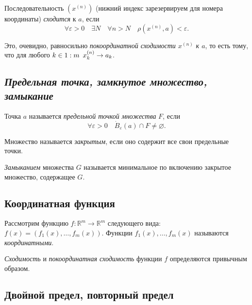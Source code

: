 \begin{definition}
	Последовательность  \((x^{(n)})\) (нижний индекс зарезервируем для номера координаты) \textit{сходится} к \(a\), если \[
		\forall \varepsilon > 0 \quad \exists N \quad \forall n > N \quad \rho(x^{(n)}, a) < \varepsilon.
	\]
	
	Это, очевидно, равносильно \textit{покоординатной сходимости \(x^{(n)}\) к \(a\)}, то есть тому, что для любого \(k \in 1 : m \enskip x_k^{(n)} \to a_k\).
\end{definition}

\subsection{\itshape Предельная точка, замкнутое множество, замыкание}

\begin{definition}
	Точка  \(a\) называется \textit{предельной точкой множества} \(F\), если \[
		\forall \varepsilon > 0 \quad \dot B_\varepsilon (a) \cap F \neq \varnothing.
	\]
	
	Множество называется \textit{закрытым}, если оно содержит все свои предельные точки.
	
	\textit{Замыканием} множества \(G\) называется минимальное по включению закрытое множество, содержащее \(G\).
\end{definition}

\subsection{Координатная функция}

\begin{definition}
	Рассмотрим функцию \(f \colon \mathbb{R}^m \to \mathbb{R}^m\) следующего вида: \(f(x) = (f_1 (x), \ldots, f_m (x))\). Функции \(f_1 (x), \ldots, f_m (x)\) называются \textit{координатными}.
\end{definition}

\begin{remark}
	\textit{Сходимость} и \textit{покоординатная сходимость} функции \(f\) определяются привычным образом.
\end{remark}

\subsection{Двойной предел, повторный предел}

